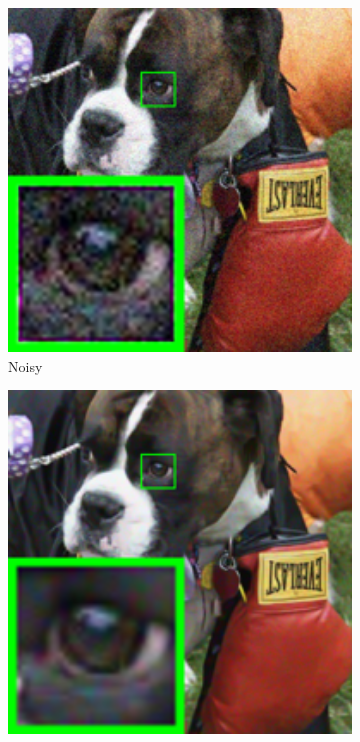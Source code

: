 \begin{figure}
    \centering
    \begin{subfigure}[t]{0.19\textwidth}
        \centering
        \includegraphics[width=1\textwidth]{images/mcwnnm/nc/resize_br_Noisy_dog.png}
		\caption{Noisy}
    \end{subfigure}
    \hfill
    \begin{subfigure}[t]{0.19\textwidth}
        \centering
        \includegraphics[width=1\textwidth]{images/mcwnnm/nc/resize_br_CBM3D_dog.png}

\end{subfigure}
\end{figure}
